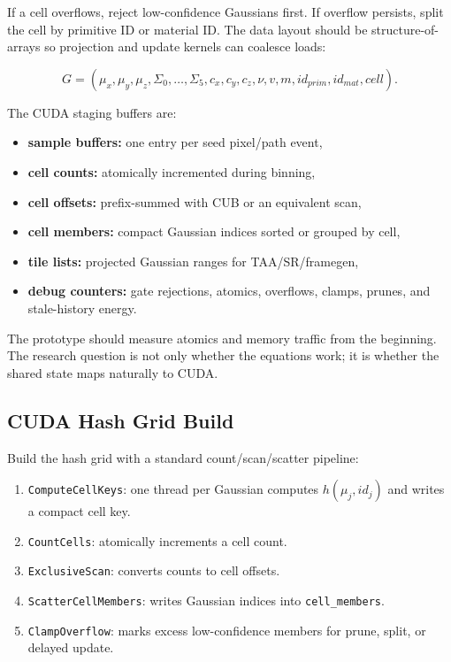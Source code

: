 \documentclass[11pt]{article}
\begin{document}
If a cell overflows, reject low-confidence Gaussians first. If overflow
persists, split the cell by primitive ID or material ID. The data layout should
be structure-of-arrays so projection and update kernels can coalesce loads:

\[
  G =
  (\mu_x,\mu_y,\mu_z,\Sigma_0,\ldots,\Sigma_5,
   c_x,c_y,c_z,\nu,v,m,id_{prim},id_{mat},cell).
\]

The CUDA staging buffers are:

\begin{itemize}
  \item \textbf{sample buffers:} one entry per seed pixel/path event,
  \item \textbf{cell counts:} atomically incremented during binning,
  \item \textbf{cell offsets:} prefix-summed with CUB or an equivalent scan,
  \item \textbf{cell members:} compact Gaussian indices sorted or grouped by
        cell,
  \item \textbf{tile lists:} projected Gaussian ranges for TAA/SR/framegen,
  \item \textbf{debug counters:} gate rejections, atomics, overflows, clamps,
        prunes, and stale-history energy.
\end{itemize}

The prototype should measure atomics and memory traffic from the beginning.
The research question is not only whether the equations work; it is whether
the shared state maps naturally to CUDA.

\subsection{CUDA Hash Grid Build}

Build the hash grid with a standard count/scan/scatter pipeline:

\begin{enumerate}
  \item \texttt{ComputeCellKeys}: one thread per Gaussian computes
        $h(\mu_j,id_j)$ and writes a compact cell key.
  \item \texttt{CountCells}: atomically increments a cell count.
  \item \texttt{ExclusiveScan}: converts counts to cell offsets.
  \item \texttt{ScatterCellMembers}: writes Gaussian indices into
        \texttt{cell\_members}.
  \item \texttt{ClampOverflow}: marks excess low-confidence members for prune,
        split, or delayed update.
\end{enumerate}
\end{document}
